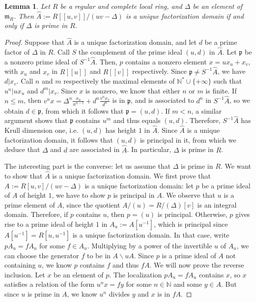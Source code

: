 \documentclass[a4paper,10pt,twoside]{article}
\newcommand{\N}{\mathbb{N}}
\newcommand{\m}{\mathfrak{m}}
\newtheorem{lem}[thm]{Lemma}
\theoremstyle{definition}
\theoremstyle{remark}
\begin{document}
\begin{lem}\label{les anneaux locaux sont UFD}
	Let $R$ be a regular and complete local ring, and $\Delta$ be an element of $\m_R$. Then $\widehat{A}:=R[[u,v]]/\left(uv-\Delta\right)$ is a unique factorization domain if and only if $\Delta$ is prime in $R$.
\end{lem}

\begin{proof}
	Suppose that $\widehat{A}$ is a unique factorization domain, and let $d$ be a prime factor of $\Delta$ in $R$. Call $S$ the complement of the prime ideal $(u,d)$ in $\widehat{A}$. Let $\mathfrak p$ be a nonzero prime ideal of $S^{-1}\widehat A$. Then, $p$ contains a nonzero element $x=ux_u+x_v$, with $x_u$ and $x_v$ in $R[[u]]$ and $R[[v]]$ respectively. Since $\mathfrak p \neq S^{-1}\widehat A$, we have $d|x_v$. Call $n$ and $m$ respectively the maximal elements of $\N^*\cup\{+\infty\}$ such that $u^n|ux_u$ and $d^m|x_v$. Since $x$ is nonzero, we know that either $n$ or $m$ is finite. If $n\leq m$, then $v^nx=\Delta^n\frac{x_u}{u^{n-1}}+d^n\frac{v^nx_v}{d^n}$ is in $\mathfrak p$, and is associated to $d^n$ in $S^{-1}\widehat{A}$, so we obtain $d\in\mathfrak p$, from which it follows that $\mathfrak p=(u,d)$. If $m<n$, a similar argument shows that $\mathfrak p$ contains $u^m$ and thus equals $(u,d)$. Therefore, $S^{-1}\widehat{A}$ has Krull dimension one, i.e. $(u,d)$ has height $1$ in $\widehat{A}$. Since $\widehat{A}$ is a unique factorization domain, it follows that $(u,d)$ is principal in it, from which we deduce that $\Delta$ and $d$ are associated in $\widehat{A}$. In particular, $\Delta$ is prime in $R$.
	
	The interesting part is the converse: let us assume that $\Delta$ is prime in $R$. We want to show that $\widehat{A}$ is a unique factorization domain. We first prove that $A:=R[u,v]/(uv-\Delta)$ is a unique factorization domain: let $p$ be a prime ideal of $A$ of height $1$, we have to show $p$ is principal in $A$. We observe that $u$ is a prime element of $A$, since the quotient $A/(u)=R/(\Delta)[v]$ is an integral domain. Therefore, if $p$ contains $u$, then $p=(u)$ is principal. Otherwise, $p$ gives rise to a prime ideal of height $1$ in $A_u:=A[u^{-1}]$, which is principal since $A[u^{-1}]=R[u,u^{-1}]$ is a unique factorization domain. In that case, write $pA_u=fA_u$ for some $f\in A_u$. Multiplying by a power of the invertible $u$ of $A_u$, we can choose the generator $f$ to be in $A\backslash uA$. Since $p$ is a prime ideal of $A$ not containing $u$, we know $p$ contains $f$ and thus $fA$. We will now prove the reverse inclusion. Let $x$ be an element of $p$. The localization $pA_u=fA_u$ contains $x$, so $x$ satisfies a relation of the form $u^nx=fy$ for some $n\in\N$ and some $y\in A$. But since $u$ is prime in $A$, we know $u^n$ divides $y$ and $x$ is in $fA$.
	

\end{proof}
\end{document}
